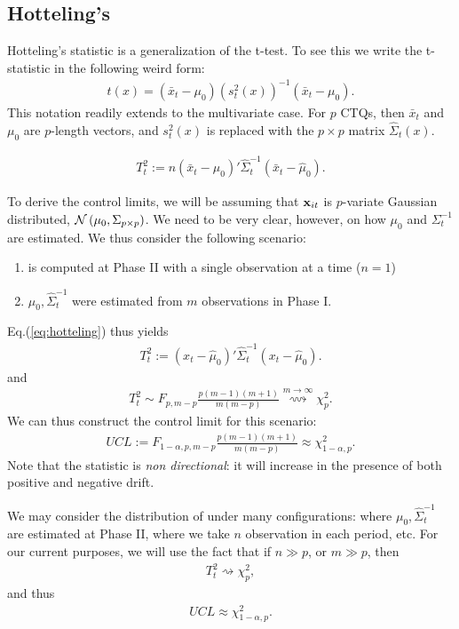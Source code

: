 \subsection{Hotteling's \tsq}
Hotteling's \tsq statistic is a generalization of the t-test.
To see this we write the t-statistic in the following weird form:
\begin{align}
	t(x)=(\bar{x}_t-\mu_0) (s^2_t(x))^{-1} (\bar{x}_t-\mu_0).
\end{align}
This notation readily extends to the multivariate case. 
For $p$ CTQs, then $\bar{x}_t$ and $\mu_0$ are $p$-length vectors, and $s^2_t(x)$ is replaced with the $p \times p$ matrix $\hat{\Sigma}_t(x)$.
\begin{definition}
\begin{align}
\label{eq:hotteling}
	T^2_t := n (\bar{x}_t-\hat{\mu}_0)' \hat{\Sigma}_t^{-1} (\bar{x}_t-\hat{\mu}_0).
\end{align}
\end{definition}
To derive the control limits, we will be assuming that $\mathbf{x}_{it}$ is $p$-variate Gaussian distributed, $\mathcal{N}\left(\mu_0, \Sigma_{p \times p}\right)$. 
We need to be very clear, however, on how $\mu_0$ and $\Sigma_t^{-1}$ are estimated. 
We thus consider the following scenario:
\begin{enumerate}
\item \tsq is computed at Phase II with a single observation at a time ($n=1$)
\item $\mu_0,\hat{\Sigma}_t^{-1}$ were estimated from $m$ observations in Phase I.
\end{enumerate}
Eq.(\ref{eq:hotteling}) thus yields 
\begin{align}
	T^2_t := (x_t-\hat{\mu}_0)' \hat{\Sigma}_t^{-1} (x_t-\hat{\mu}_0).
\end{align}
and 
\begin{align}
	T^2_t \sim F_{p,m-p} \frac{p(m-1)(m+1)}{m(m-p)} \overset{m \to \infty}{\rightsquigarrow }\chi^2_p.
\end{align}
We can thus construct the control limit for this scenario:
\begin{align}
	UCL:= F_{1-\alpha,p,m-p} \frac{p(m-1)(m+1)}{m(m-p)} \approx \chi^2_{1-\alpha,p}.
\end{align}
Note that the \tsq statistic is \emph{non directional}: it will increase in the presence of both positive and negative drift. 

We may consider the distribution of \tsq under many configurations: where $\mu_0,\hat{\Sigma}_t^{-1}$ are estimated at Phase II, where we take $n$ observation in each period, etc. 
For our current purposes, we will use the fact that if $n \gg p$, or $m \gg p$, then 
\begin{align}
	T^2_t  \rightsquigarrow \chi^2_p,
\end{align}
and thus
\begin{align}
	UCL \approx \chi^2_{1-\alpha,p}.
\end{align}

